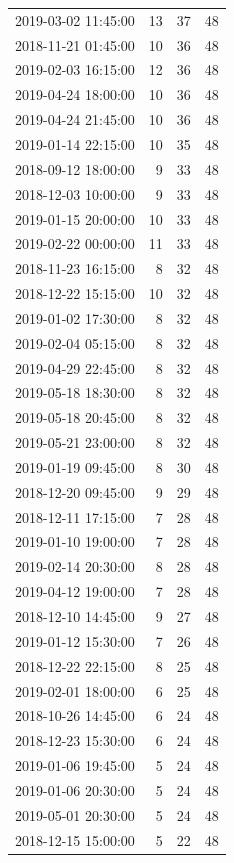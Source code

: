 \begin{tabular}{lrrr}
2019-03-02 11:45:00 & 13 & 37 & 48 \\
2018-11-21 01:45:00 & 10 & 36 & 48 \\
2019-02-03 16:15:00 & 12 & 36 & 48 \\
2019-04-24 18:00:00 & 10 & 36 & 48 \\
2019-04-24 21:45:00 & 10 & 36 & 48 \\
2019-01-14 22:15:00 & 10 & 35 & 48 \\
2018-09-12 18:00:00 & 9 & 33 & 48 \\
2018-12-03 10:00:00 & 9 & 33 & 48 \\
2019-01-15 20:00:00 & 10 & 33 & 48 \\
2019-02-22 00:00:00 & 11 & 33 & 48 \\
2018-11-23 16:15:00 & 8 & 32 & 48 \\
2018-12-22 15:15:00 & 10 & 32 & 48 \\
2019-01-02 17:30:00 & 8 & 32 & 48 \\
2019-02-04 05:15:00 & 8 & 32 & 48 \\
2019-04-29 22:45:00 & 8 & 32 & 48 \\
2019-05-18 18:30:00 & 8 & 32 & 48 \\
2019-05-18 20:45:00 & 8 & 32 & 48 \\
2019-05-21 23:00:00 & 8 & 32 & 48 \\
2019-01-19 09:45:00 & 8 & 30 & 48 \\
2018-12-20 09:45:00 & 9 & 29 & 48 \\
2018-12-11 17:15:00 & 7 & 28 & 48 \\
2019-01-10 19:00:00 & 7 & 28 & 48 \\
2019-02-14 20:30:00 & 8 & 28 & 48 \\
2019-04-12 19:00:00 & 7 & 28 & 48 \\
2018-12-10 14:45:00 & 9 & 27 & 48 \\
2019-01-12 15:30:00 & 7 & 26 & 48 \\
2018-12-22 22:15:00 & 8 & 25 & 48 \\
2019-02-01 18:00:00 & 6 & 25 & 48 \\
2018-10-26 14:45:00 & 6 & 24 & 48 \\
2018-12-23 15:30:00 & 6 & 24 & 48 \\
2019-01-06 19:45:00 & 5 & 24 & 48 \\
2019-01-06 20:30:00 & 5 & 24 & 48 \\
2019-05-01 20:30:00 & 5 & 24 & 48 \\
2018-12-15 15:00:00 & 5 & 22 & 48 \\

\end{tabular}
